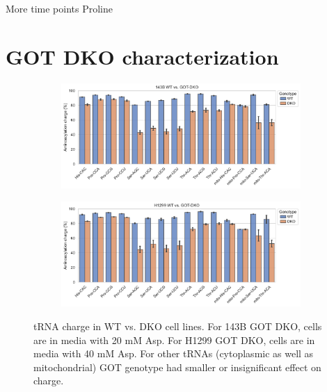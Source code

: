 More time points
Proline









\FloatBarrier
\section{GOT DKO characterization}


\begin{figure}[!ht]
     \centering
     \begin{subfigure}[b]{0.8\textwidth}
         \includegraphics[width=\textwidth]{figures/sapp/DKO_char/143B-WT-DKO_charge.pdf}
     \end{subfigure}
     \begin{subfigure}[b]{0.8\textwidth}
         \vspace{2pt}
         \includegraphics[width=\textwidth]{figures/sapp/DKO_char/H1299-WT-DKO_charge.pdf}
     \end{subfigure}
     \hfill
        \caption[tRNA charge in WT vs. GOT DKO]{
        tRNA charge in WT vs. DKO cell lines.
        For 143B GOT DKO, cells are in media with 20 mM Asp.
        For H1299 GOT DKO, cells are in media with 40 mM Asp.
        For other tRNAs (cytoplasmic as well as mitochondrial) GOT genotype had smaller or insignificant effect on charge.
        }
        \label{fig:sapp:tRNA:WT_vs_DKO}
\end{figure}


























